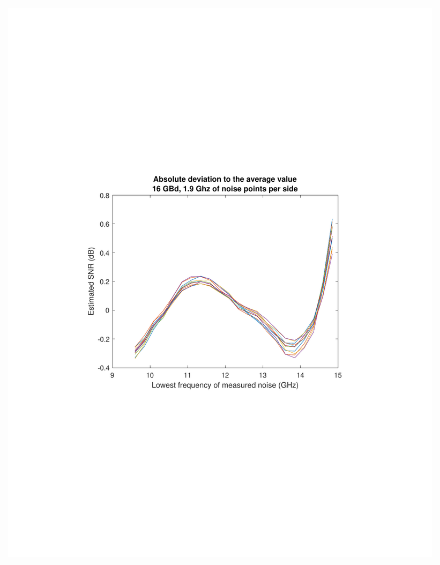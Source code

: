 \begin{refsection}
\begin{figure}[H]
	\centering
	\begin{minipage}{0.43\textwidth}
		\centering
		\includegraphics[clip, trim=4cm 8cm 4cm 8cm,
		width=1\textwidth]{./sdf/m_qam_system/figures/snr/absDev/16GBSNRAbsDev.pdf}
		\subcaption{\label{fig:snrAbsDev_16_500}}
	\end{minipage}
	\begin{minipage}{0.43\textwidth}
		\centering

\end{minipage}
\end{figure}
\end{refsection}
